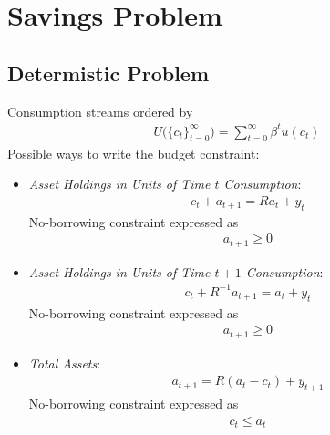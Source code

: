 \documentclass[12pt]{article}
\theoremstyle{plain}
\theoremstyle{definition}
\theoremstyle{remark}
\newcommand{\sumtinfz}{\sum^\infty_{t=0}}
\newcommand{\tinfz}{^\infty_{t=0}}
\begin{document}
\clearpage
\section{Savings Problem}

\subsection{Determistic Problem}

Consumption streams ordered by
\begin{align*}
  U\big(\{c_t\}\tinfz\big)
  = \sumtinfz \beta^tu(c_t)
\end{align*}
Possible ways to write the budget constraint:
\begin{itemize}
  \item
    \emph{Asset Holdings in Units of Time $t$ Consumption}:
    \begin{align*}
      c_t + a_{t+1} = Ra_t + y_t
    \end{align*}
    No-borrowing constraint expressed as
    \begin{align*}
      a_{t+1} \geq 0
    \end{align*}

  \item
    \emph{Asset Holdings in Units of Time $t+1$ Consumption}:
    \begin{align*}
      c_t + R^{-1}a_{t+1} = a_t + y_t
    \end{align*}
    No-borrowing constraint expressed as
    \begin{align*}
      a_{t+1} \geq 0
    \end{align*}

  \item \emph{Total Assets}:
    \begin{align*}
      a_{t+1} = R(a_t-c_t) + y_{t+1}
    \end{align*}
    No-borrowing constraint expressed as
    \begin{align*}
      c_t \leq a_t
    \end{align*}


\end{itemize}






\end{document}
